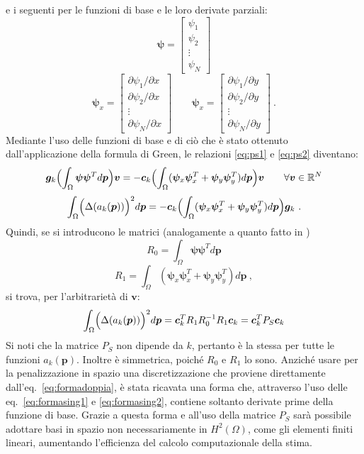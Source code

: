 \documentclass[a4paper,11pt,twoside,openright]{book}							%
\begin{document}
e i seguenti per le funzioni di base e le loro derivate parziali:
$$
\bm \psi =
\begin{bmatrix}
\psi_{1}  \\
\psi_{2}  \\
\vdots\\
\psi_{N}
\end{bmatrix}
$$
\begin{equation}
\bm \psi_x=  \begin{bmatrix}
\partial \psi_{1}/\partial x \\
\partial \psi_{2}/\partial x  \\
\vdots\\
\partial \psi_{N}/\partial x \end{bmatrix} 
\qquad
\bm \psi_x=  \begin{bmatrix}
\partial \psi_{1}/\partial y  \\
\partial \psi_{2}/\partial y  \\
\vdots\\
\partial \psi_{N}/\partial y\end{bmatrix} \ .
\end{equation}
Mediante l'uso delle funzioni di base e di ciò che è stato ottenuto dall'applicazione della formula di Green, le relazioni \eqref{eq:ps1} e \eqref{eq:ps2} diventano:
$$
\bm{g}_k \Bigl(\int_\Omega \bm \psi \bm \psi^T d \bm p\Bigr)\bm{v}=
-\bm{c}_k \Bigl(\int_\Omega (\bm \psi_x \bm \psi_x^T + \bm \psi_y \bm \psi_y^T)d \bm p\Bigr) \bm{v} \qquad \forall \bm{v} \in \mathbb{R}^N
$$
$$
\int_{\Omega} \Bigl( \Delta(  a_k(\bm p)  ) \Bigr)^2 d \bm p = -\bm{c}_k \Bigl(\int_\Omega (\bm \psi_x \bm \psi_x^T + \bm \psi_y \bm \psi_y^T) d \bm p\Bigr)\bm{g}_k \ .
$$
Quindi, se si introducono le matrici (analogamente a quanto fatto in \cite{art:sangalli})
$$ R_0 = \int_\Omega \bm \psi \bm \psi^T d \bm p$$
$$ R_1 = \int_\Omega (\bm \psi_x \bm \psi_x^T + \bm \psi_y \bm \psi_y^T)d \bm p \ ,$$
si trova, per l'arbitrarietà di $\bm v$:
\begin{equation}
\label{eq:pspace}
\int_{\Omega} \Bigl( \Delta(  a_k(\bm p)  ) \Bigr)^2 d \bm p = \bm{c}_k^T R_1 R_0^{-1} R_1 \bm{c}_k=\bm{c}_k^T P_S \bm{c}_k
\end{equation}
Si noti che la matrice $P_S$ non dipende da $k$, pertanto è la stessa per tutte le funzioni $a_k(\bm{p})$. Inoltre è simmetrica, poiché $R_0$ e $R_1$ lo sono.
Anziché usare per la penalizzazione in spazio una discretizzazione che proviene direttamente dall'eq.~\eqref{eq:formadoppia}, è stata ricavata una forma che, attraverso l'uso delle eq.~\eqref{eq:formasing1} e \eqref{eq:formasing2}, contiene soltanto derivate prime della funzione di base. Grazie a questa forma e all'uso della matrice $P_S$ sarà possibile adottare basi in spazio non necessariamente in $H^2(\Omega)$, come gli elementi finiti lineari, aumentando l'efficienza del calcolo computazionale della stima. 
\end{document}
